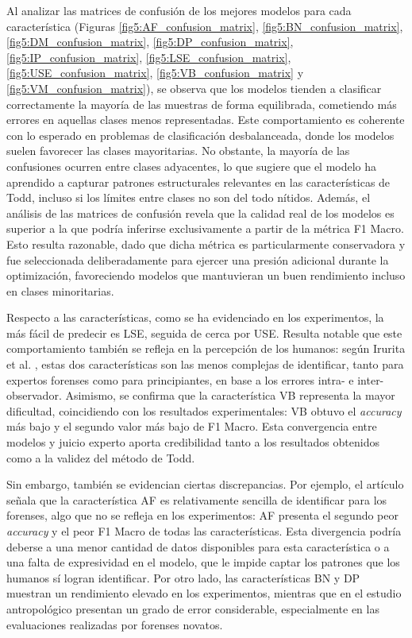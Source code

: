 Al analizar las matrices de confusión de los mejores modelos para cada característica (Figuras \ref{fig5:AF_confusion_matrix}, \ref{fig5:BN_confusion_matrix}, \ref{fig5:DM_confusion_matrix}, \ref{fig5:DP_confusion_matrix}, \ref{fig5:IP_confusion_matrix}, \ref{fig5:LSE_confusion_matrix}, \ref{fig5:USE_confusion_matrix}, \ref{fig5:VB_confusion_matrix} y \ref{fig5:VM_confusion_matrix}), se observa que los modelos tienden a clasificar correctamente la mayoría de las muestras de forma equilibrada, cometiendo más errores en aquellas clases menos representadas. Este comportamiento es coherente con lo esperado en problemas de clasificación desbalanceada, donde los modelos suelen favorecer las clases mayoritarias. No obstante, la mayoría de las confusiones ocurren entre clases adyacentes, lo que sugiere que el modelo ha aprendido a capturar patrones estructurales relevantes en las características de Todd, incluso si los límites entre clases no son del todo nítidos. Además, el análisis de las matrices de confusión revela que la calidad real de los modelos es superior a la que podría inferirse exclusivamente a partir de la métrica F1 Macro. Esto resulta razonable, dado que dicha métrica es particularmente conservadora y fue seleccionada deliberadamente para ejercer una presión adicional durante la optimización, favoreciendo modelos que mantuvieran un buen rendimiento incluso en clases minoritarias.

Respecto a las características, como se ha evidenciado en los experimentos, la más fácil de predecir es LSE, seguida de cerca por USE. Resulta notable que este comportamiento también se refleja en la percepción de los humanos: según Irurita et al. \cite{irurita2025pubic}, estas dos características son las menos complejas de identificar, tanto para expertos forenses como para principiantes, en base a los errores intra- e inter-observador. Asimismo, se confirma que la característica VB representa la mayor dificultad, coincidiendo con los resultados experimentales: VB obtuvo el \textit{accuracy} más bajo y el segundo valor más bajo de F1 Macro. Esta convergencia entre modelos y juicio experto aporta credibilidad tanto a los resultados obtenidos como a la validez del método de Todd.

Sin embargo, también se evidencian ciertas discrepancias. Por ejemplo, el artículo señala que la característica AF es relativamente sencilla de identificar para los forenses, algo que no se refleja en los experimentos: AF presenta el segundo peor \textit{accuracy} y el peor F1 Macro de todas las características. Esta divergencia podría deberse a una menor cantidad de datos disponibles para esta característica o a una falta de expresividad en el modelo, que le impide captar los patrones que los humanos sí logran identificar. Por otro lado, las características BN y DP muestran un rendimiento elevado en los experimentos, mientras que en el estudio antropológico presentan un grado de error considerable, especialmente en las evaluaciones realizadas por forenses novatos. 

